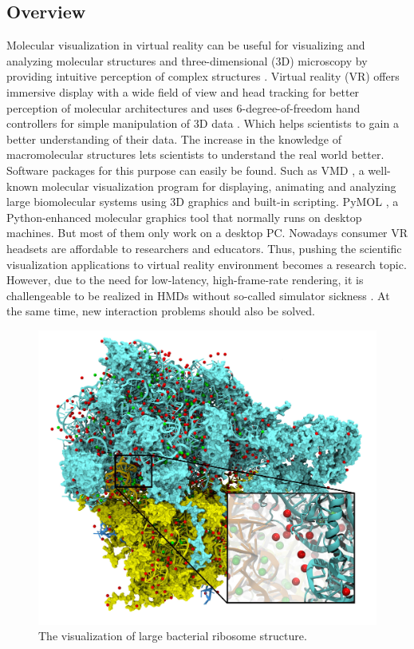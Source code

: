 \documentclass[10pt,twocolumn,letterpaper]{article}
\begin{document}
\subsection{Overview}
Molecular visualization in virtual reality can be useful for visualizing and analyzing molecular structures and three-dimensional (3D) microscopy by providing intuitive perception of complex structures \cite{Xu589366}. Virtual reality (VR) offers immersive display with a wide field of view and head tracking for better perception of molecular architectures and uses 6-degree-of-freedom hand controllers for simple manipulation of 3D data \cite{6DOF}. Which helps scientists to gain a better understanding of their data. The increase in the knowledge of macromolecular structures lets scientists to understand the real world better. Software packages for this purpose can easily be found. Such as VMD \cite{VMD}, a well-known molecular visualization program for displaying, animating and analyzing large biomolecular systems using 3D graphics and built-in scripting. PyMOL \cite{pymol}, a Python-enhanced molecular graphics tool that normally runs on desktop machines. But most of them only work on a desktop PC. Nowadays consumer VR headsets are affordable to researchers and educators. Thus, pushing the scientific visualization applications to virtual reality environment becomes a research topic. However, due to the need for low-latency, high-frame-rate rendering, it is challengeable to be realized in HMDs without so-called simulator sickness \cite{LaViola:2000}. At the same time, new interaction problems should also be solved.

\begin{figure}[h]
\begin{center}
   \includegraphics[width=1.0\linewidth]{complex-structure.jpg}
\end{center}
   \caption{The visualization of large bacterial ribosome structure.}
\label{fig:complex-structure}
\end{figure}
\end{document}
